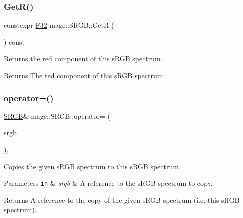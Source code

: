 \subsubsection{\texorpdfstring{Get\+R()}{GetR()}}
{\footnotesize\ttfamily constexpr \mbox{\hyperlink{namespacemage_aa97e833b45f06d60a0a9c4fc22ae02c0}{F32}} mage\+::\+S\+R\+G\+B\+::\+GetR (\begin{DoxyParamCaption}{ }\end{DoxyParamCaption}) const\hspace{0.3cm}{\ttfamily [noexcept]}}

Returns the red component of this s\+R\+GB spectrum.

\begin{DoxyReturn}{Returns}
The red component of this s\+R\+GB spectrum. 
\end{DoxyReturn}
\mbox{\label{structmage_1_1_s_r_g_b_a08c0aaef872868f2415b5d58c5611764}} 
\subsubsection{\texorpdfstring{operator=()}{operator=()}\hspace{0.1cm}{\footnotesize\ttfamily [1/2]}}
{\footnotesize\ttfamily \mbox{\hyperlink{structmage_1_1_s_r_g_b}{S\+R\+GB}}\& mage\+::\+S\+R\+G\+B\+::operator= (\begin{DoxyParamCaption}\item[{const \mbox{\hyperlink{structmage_1_1_s_r_g_b}{S\+R\+GB}} \&}]{srgb }\end{DoxyParamCaption})\hspace{0.3cm}{\ttfamily [default]}, {\ttfamily [noexcept]}}

Copies the given s\+R\+GB spectrum to this s\+R\+GB spectrum.


\begin{DoxyParams}[1]{Parameters}
\mbox{\tt in}  & {\em srgb} & A reference to the s\+R\+GB spectrum to copy. \\
\hline
\end{DoxyParams}
\begin{DoxyReturn}{Returns}
A reference to the copy of the given s\+R\+GB spectrum (i.\+e. this s\+R\+GB spectrum). 
\end{DoxyReturn}
\mbox{\label{structmage_1_1_s_r_g_b_a73ee0aadb04bbf07976b1e2daded2aff}} 
